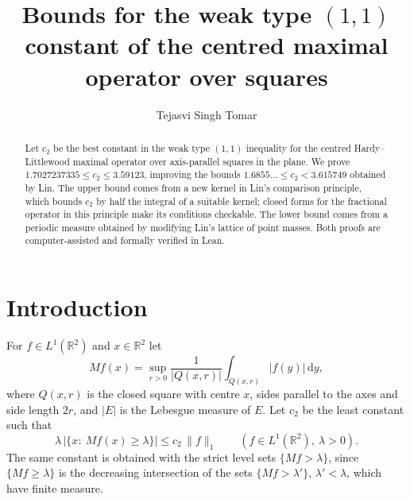 \documentclass[11pt]{amsart}
\theoremstyle{definition}
\theoremstyle{remark}
\numberwithin{equation}{section}
\newcommand{\R}{\mathbb{R}}
\newcommand{\dd}{\,\mathrm{d}}
\newcommand{\CBOUND}{3.59123}
\newcommand{\LBDEC}{1.7027237335}
\begin{document}
\title[Weak type constant over squares]{Bounds for the weak type $(1,1)$ constant of the centred maximal operator over squares}
\author{Tejasvi Singh Tomar}
\renewcommand{\urladdrname}{{\itshape ORCID}}

\begin{abstract}
Let $c_2$ be the best constant in the weak type $(1,1)$ inequality for the centred Hardy--Littlewood maximal operator over axis-parallel squares in the plane. We prove $\LBDEC\le c_2\le\CBOUND$, improving the bounds $1.6855\ldots\le c_2<3.615749$ obtained by Lin. The upper bound comes from a new kernel in Lin's comparison principle, which bounds $c_2$ by half the integral of a suitable kernel; closed forms for the fractional operator in this principle make its conditions checkable. The lower bound comes from a periodic measure obtained by modifying Lin's lattice of point masses. Both proofs are computer-assisted and formally verified in Lean.
\end{abstract}

\maketitle

\section{Introduction}\label{sec:intro}

For $f\in L^1(\R^2)$ and $x\in\R^2$ let
\[
Mf(x)=\sup_{r>0}\frac{1}{|Q(x,r)|}\int_{Q(x,r)}|f(y)|\dd y,
\]
where $Q(x,r)$ is the closed square with centre $x$, sides parallel to the axes and side length $2r$, and $|E|$ is the Lebesgue measure of $E$. Let $c_2$ be the least constant such that
\begin{equation}\label{eq:weak}
\lambda\,\bigl|\{x:\ Mf(x)\ge\lambda\}\bigr|\le c_2\,\|f\|_1\qquad(f\in L^1(\R^2),\ \lambda>0).
\end{equation}
The same constant is obtained with the strict level sets $\{Mf>\lambda\}$, since $\{Mf\ge\lambda\}$ is the decreasing intersection of the sets $\{Mf>\lambda'\}$, $\lambda'<\lambda$, which have finite measure.
\end{document}
